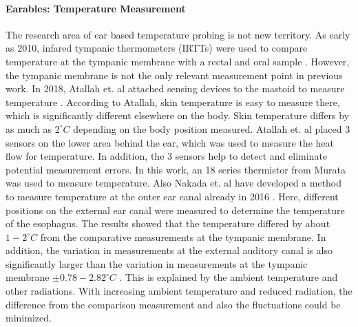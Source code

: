 \paragraph{Earables: Temperature Measurement}
The research area of ear based temperature probing is not new territory.
As early as 2010, infared tympanic thermometers (IRTTs) were used to compare temperature at the tympanic membrane with a rectal and oral sample \cite{bagleyValidityFieldExpedient2011, basakComparisonThreeDifferent2013, bhanguDetectionManagementHypothermia2010, fogtNoninvasiveMeasuresCore2017, ComparisonTwoMethods, kallmunzerLocalHeadNeck2011, muthInfraredEarThermometry2010, moran-navarroValiditySkinOral2019, leeValidityInfraredTympanic2011, keeneAccuracyTympanicTemperature2015}.
However, the tympanic membrane is not the only relevant measurement point in previous work. 
In 2018, Atallah et. al attached sensing devices to the mastoid to measure temperature \cite{atallahErgonomicWearableCore2018}. 
According to Atallah, skin temperature is easy to measure there, which is significantly different elsewhere on the body. 
Skin temperature differs by as much as $2 ^\circ C$ depending on the body position measured.
Atallah et. al placed 3 sensors on the lower area behind the ear, which was used to measure the heat flow for temperature.
In addition, the 3 sensors help to detect and eliminate potential measurement errors.
In this work, an 18 series thermistor from Murata was used to measure temperature.
Also Nakada et. al have developed a method to measure temperature at the outer ear canal already in 2016 \cite{nakadaDevelopmentMethodEstimating2017a}.
Here, different positions on the external ear canal were measured to determine the temperature of the esophagus. 
The results showed that the temperature differed by about $ 1-2 ^\circ C$ from the comparative measurements at the tympanic membrane.
In addition, the variation in measurements at the external auditory canal is also significantly larger than the variation in measurements at the tympanic membrane $ \pm 0.78-2.82 ^\circ C$ \cite{nakadaDevelopmentMethodEstimating2017a}.
This is explained by the ambient temperature and other radiations.
With increasing ambient temperature and reduced radiation, the difference from the comparison measurement and also the fluctuations could be minimized.
